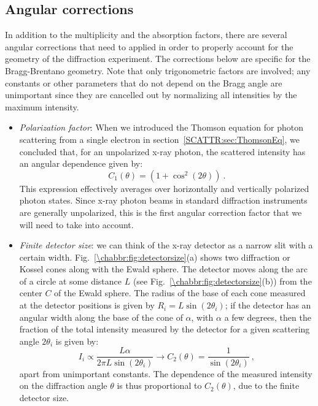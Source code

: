 \subsection{Angular corrections}\label{\chabbr:ssec:corrections}
In addition to the multiplicity and the absorption factors, there are several angular corrections that need to applied in order to properly account for the geometry of the diffraction experiment.  The corrections below are specific for the Bragg-Brentano geometry.  Note that only trigonometric factors are involved; any constants or other parameters that do not depend on the Bragg angle are unimportant since they are cancelled out by normalizing all intensities by the maximum intensity.

\begin{itemize}
	\item \textit{Polarization factor}:  When we introduced the Thomson equation for photon scattering from a single electron in section~\ref{SCATTR:sec:ThomsonEq}, we concluded that, for an unpolarized x-ray photon, the scattered intensity has an angular dependence given by:
\begin{equation}
	C_1(\theta) = \left(1+\cos^2(2\theta)\right)\ .
\end{equation}
This expression effectively averages over horizontally and vertically polarized photon states.  Since x-ray photon beams in standard diffraction instruments are generally unpolarized, this is the first angular correction factor that we will need to take into account.

	\item \textit{Finite detector size}: we can think of the x-ray detector as a narrow slit with a certain width. Fig.~\ref{\chabbr:fig:detectorsize}(a) shows two diffraction or Kossel cones along with the Ewald sphere. The detector moves along the arc of a circle at some distance $L$ (see Fig.~\ref{\chabbr:fig:detectorsize}(b)) from the center $C$ of the Ewald sphere.  The radius of the base of each cone measured at the detector positions is given by $R_i=L\sin(2\theta_i)$; if the detector has an angular width along the base of the cone of $\alpha$, with $\alpha$ a few degrees, then the fraction of the total intensity measured by the detector for a given scattering angle $2\theta_i$ is given by:
	\[
		I_i \propto \frac{L\alpha}{2\pi L\sin(2\theta_i)}\rightarrow C_2(\theta)=\frac{1}{\sin(2\theta_i)}\ ,
	\]
apart from unimportant constants.  The dependence of the measured intensity on the diffraction angle $\theta$ is thus proportional to $C_2(\theta)$, due to the finite detector size. 


\end{itemize}
